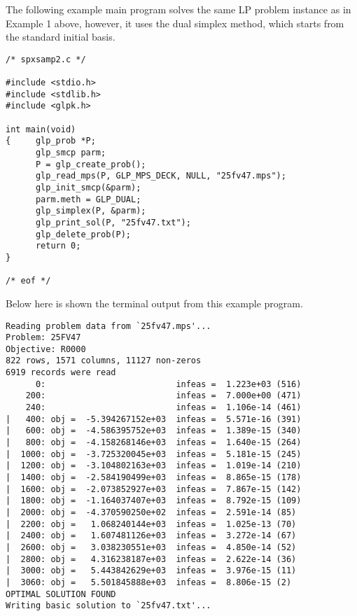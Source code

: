 \newpage


The following example main program solves the same LP problem instance
as in Example 1 above, however, it uses the dual simplex method, which
starts from the standard initial basis.

\begin{footnotesize}
\begin{verbatim}
/* spxsamp2.c */

#include <stdio.h>
#include <stdlib.h>
#include <glpk.h>

int main(void)
{     glp_prob *P;
      glp_smcp parm;
      P = glp_create_prob();
      glp_read_mps(P, GLP_MPS_DECK, NULL, "25fv47.mps");
      glp_init_smcp(&parm);
      parm.meth = GLP_DUAL;
      glp_simplex(P, &parm);
      glp_print_sol(P, "25fv47.txt");
      glp_delete_prob(P);
      return 0;
}

/* eof */
\end{verbatim}
\end{footnotesize}

Below here is shown the terminal output from this example program.

\begin{footnotesize}
\begin{verbatim}
Reading problem data from `25fv47.mps'...
Problem: 25FV47
Objective: R0000
822 rows, 1571 columns, 11127 non-zeros
6919 records were read
      0:                          infeas =  1.223e+03 (516)
    200:                          infeas =  7.000e+00 (471)
    240:                          infeas =  1.106e-14 (461)
|   400: obj =  -5.394267152e+03  infeas =  5.571e-16 (391)
|   600: obj =  -4.586395752e+03  infeas =  1.389e-15 (340)
|   800: obj =  -4.158268146e+03  infeas =  1.640e-15 (264)
|  1000: obj =  -3.725320045e+03  infeas =  5.181e-15 (245)
|  1200: obj =  -3.104802163e+03  infeas =  1.019e-14 (210)
|  1400: obj =  -2.584190499e+03  infeas =  8.865e-15 (178)
|  1600: obj =  -2.073852927e+03  infeas =  7.867e-15 (142)
|  1800: obj =  -1.164037407e+03  infeas =  8.792e-15 (109)
|  2000: obj =  -4.370590250e+02  infeas =  2.591e-14 (85)
|  2200: obj =   1.068240144e+03  infeas =  1.025e-13 (70)
|  2400: obj =   1.607481126e+03  infeas =  3.272e-14 (67)
|  2600: obj =   3.038230551e+03  infeas =  4.850e-14 (52)
|  2800: obj =   4.316238187e+03  infeas =  2.622e-14 (36)
|  3000: obj =   5.443842629e+03  infeas =  3.976e-15 (11)
|  3060: obj =   5.501845888e+03  infeas =  8.806e-15 (2)
OPTIMAL SOLUTION FOUND
Writing basic solution to `25fv47.txt'...
\end{verbatim}
\end{footnotesize}

